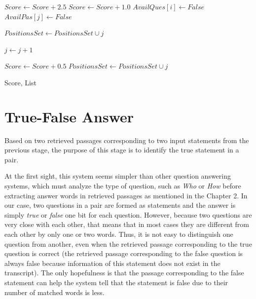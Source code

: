 \begin{algorithm}
\begin{algorithmic} [1]
		\STATE $Score \gets Score + 2.5$ 
		\ELSE 
		\STATE $Score \gets Score + 1.0$ 
		\ENDIF
		\STATE $AvailQues[i] \gets False$  
		\STATE $AvailPas[j] \gets False $ 
				
		\STATE $PositionsSet \gets PositionsSet \cup j$ 
	\ENDIF

		
	\STATE $j \gets j+1$
	\ENDWHILE
\ENDFOR

\STATE{}
			\STATE $Score \gets Score + 0.5$
			\STATE $PositionsSet \gets PositionsSet \cup j$ 
		\ENDIF
	\ENDFOR
\ENDFOR

\RETURN Score, List
\end{algorithmic}
\end{algorithm}

\newpage
\normalsize




\newpage

\section{True-False Answer}

Based on two retrieved passages corresponding to two input statements from the previous stage, the purpose of this stage is to identify the true statement in a pair. 

At the first sight, this system seems simpler than other question answering systems, which must analyze the type of question, such as \textit{Who} or \textit{How} before extracting answer words in retrieved passages as mentioned in the Chapter 2. In our case, two questions in a pair are formed as statements and the answer is simply \textit{true} or \textit{false} one bit for each question. However, because two questions are very close with each other, that means that in most cases they are different from each other by only one or two words. Thus, it is not easy to distinguish one question from another, even when the retrieved passage corresponding to the true question is correct (the retrieved passage corresponding to the false question is always false because information of this statement does not exist in the transcript). The only hopefulness is that the passage corresponding to the false statement can help the system tell that the statement is false due to their number of matched words is less.

